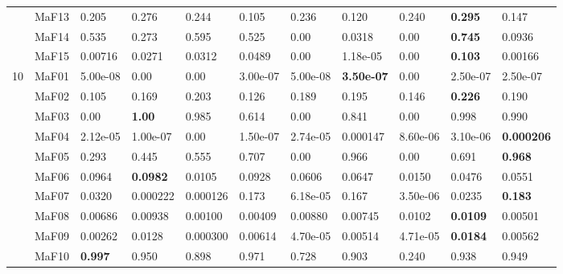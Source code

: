 \documentclass[]{article}
\begin{document}
\begin{landscape}
\begin{table}
\begin{footnotesize}
\begin{tabular}{|l|l|l|l|l|l|l|l|l|l|l|}
 & MaF13 & 0.205 & \cellcolor{gray95} 0.276 & 0.244 & 0.105 & 0.236 & 0.120 & 0.240 & \cellcolor{gray95} {\bf 0.295} & 0.147\\
 & MaF14 & \cellcolor{gray95} 0.535 & 0.273 & \cellcolor{gray95} 0.595 & \cellcolor{gray95} 0.525 & 0.00 & 0.0318 & 0.00 & \cellcolor{gray95} {\bf 0.745} & 0.0936\\
 & MaF15 & 0.00716 & 0.0271 & \cellcolor{gray95} 0.0312 & \cellcolor{gray95} 0.0489 & 0.00 & 1.18e-05 & 0.00 & \cellcolor{gray95} {\bf 0.103} & 0.00166\\
\hline

\multirow{15}{*}{10} & MaF01 & \cellcolor{gray95} 5.00e-08 & \cellcolor{gray95} 0.00 & \cellcolor{gray95} 0.00 & \cellcolor{gray95} 3.00e-07 & \cellcolor{gray95} 5.00e-08 & \cellcolor{gray95} {\bf 3.50e-07} & \cellcolor{gray95} 0.00 & \cellcolor{gray95} 2.50e-07 & \cellcolor{gray95} 2.50e-07\\
 & MaF02 & 0.105 & 0.169 & \cellcolor{gray95} 0.203 & 0.126 & 0.189 & \cellcolor{gray95} 0.195 & 0.146 & \cellcolor{gray95} {\bf 0.226} & 0.190\\
 & MaF03 & 0.00 & \cellcolor{gray95} {\bf 1.00} & 0.985 & 0.614 & 0.00 & 0.841 & 0.00 & \cellcolor{gray95} 0.998 & \cellcolor{gray95} 0.990\\
 & MaF04 & 2.12e-05 & 1.00e-07 & 0.00 & 1.50e-07 & \cellcolor{gray95} 2.74e-05 & \cellcolor{gray95} 0.000147 & 8.60e-06 & 3.10e-06 & \cellcolor{gray95} {\bf 0.000206}\\
 & MaF05 & 0.293 & 0.445 & 0.555 & \cellcolor{gray95} 0.707 & 0.00 & \cellcolor{gray95} 0.966 & 0.00 & \cellcolor{gray95} 0.691 & \cellcolor{gray95} {\bf 0.968}\\
 & MaF06 & \cellcolor{gray95} 0.0964 & \cellcolor{gray95} {\bf 0.0982} & 0.0105 & \cellcolor{gray95} 0.0928 & 0.0606 & 0.0647 & 0.0150 & 0.0476 & 0.0551\\
 & MaF07 & 0.0320 & 0.000222 & 0.000126 & \cellcolor{gray95} 0.173 & 6.18e-05 & \cellcolor{gray95} 0.167 & 3.50e-06 & 0.0235 & \cellcolor{gray95} {\bf 0.183}\\
 & MaF08 & 0.00686 & \cellcolor{gray95} 0.00938 & 0.00100 & 0.00409 & 0.00880 & 0.00745 & \cellcolor{gray95} 0.0102 & \cellcolor{gray95} {\bf 0.0109} & 0.00501\\
 & MaF09 & 0.00262 & \cellcolor{gray95} 0.0128 & 0.000300 & 0.00614 & 4.70e-05 & 0.00514 & 4.71e-05 & \cellcolor{gray95} {\bf 0.0184} & 0.00562\\
 & MaF10 & \cellcolor{gray95} {\bf 0.997} & 0.950 & 0.898 & \cellcolor{gray95} 0.971 & 0.728 & 0.903 & 0.240 & 0.938 & 0.949\\

\end{tabular}
\end{footnotesize}
\end{table}
\end{landscape}
\end{document}
